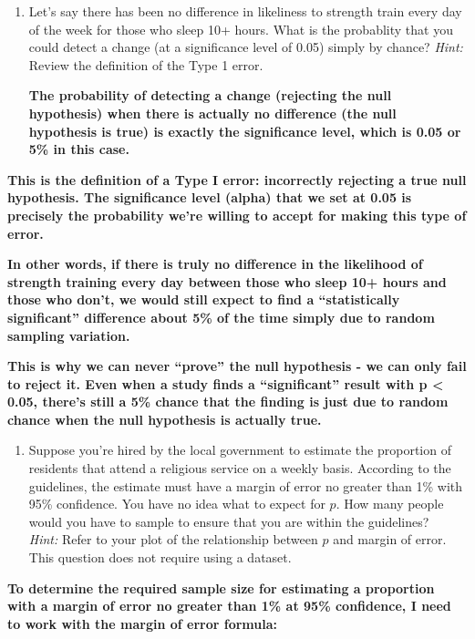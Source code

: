 \documentclass[
]{article}
\providecommand{\tightlist}{%
  \setlength{\itemsep}{0pt}\setlength{\parskip}{0pt}}
\begin{document}
\begin{enumerate}
\def\labelenumi{\arabic{enumi}.}
\setcounter{enumi}{9}
\item
  Let's say there has been no difference in likeliness to strength train
  every day of the week for those who sleep 10+ hours. What is the
  probablity that you could detect a change (at a significance level of
  0.05) simply by chance? \emph{Hint:} Review the definition of the Type
  1 error.

  \textbf{The probability of detecting a change (rejecting the null
  hypothesis) when there is actually no difference (the null hypothesis
  is true) is exactly the significance level, which is 0.05 or 5\% in
  this case.}
\end{enumerate}

\textbf{This is the definition of a Type I error: incorrectly rejecting
a true null hypothesis. The significance level (alpha) that we set at
0.05 is precisely the probability we're willing to accept for making
this type of error.}

\textbf{In other words, if there is truly no difference in the
likelihood of strength training every day between those who sleep 10+
hours and those who don't, we would still expect to find a
``statistically significant'' difference about 5\% of the time simply
due to random sampling variation.}

\textbf{This is why we can never ``prove'' the null hypothesis - we can
only fail to reject it. Even when a study finds a ``significant'' result
with p \textless{} 0.05, there's still a 5\% chance that the finding is
just due to random chance when the null hypothesis is actually true.}

\begin{enumerate}
\def\labelenumi{\arabic{enumi}.}
\setcounter{enumi}{10}
\tightlist
\item
  Suppose you're hired by the local government to estimate the
  proportion of residents that attend a religious service on a weekly
  basis. According to the guidelines, the estimate must have a margin of
  error no greater than 1\% with 95\% confidence. You have no idea what
  to expect for \(p\). How many people would you have to sample to
  ensure that you are within the guidelines?\\
  \emph{Hint:} Refer to your plot of the relationship between \(p\) and
  margin of error. This question does not require using a dataset.
\end{enumerate}

\textbf{To determine the required sample size for estimating a
proportion with a margin of error no greater than 1\% at 95\%
confidence, I need to work with the margin of error formula:}
\end{document}
